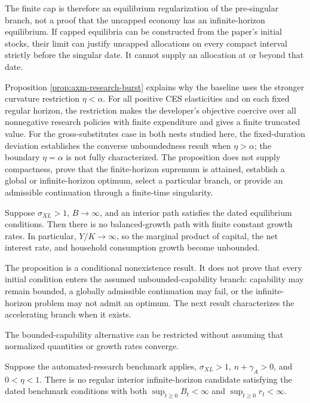 The finite cap is therefore an equilibrium regularization of the pre-singular
branch, not a proof that the uncapped economy has an infinite-horizon
equilibrium. If capped equilibria can be constructed from the paper's initial
stocks, their limit can justify uncapped allocations on every compact interval
strictly before the singular date. It cannot supply an allocation at or beyond
that date.

Proposition \ref{prop:axm-research-burst} explains why the baseline uses the
stronger curvature restriction \(\eta<\alpha\). For all positive CES
elasticities and on each fixed regular horizon, the restriction makes the
developer's objective coercive over all nonnegative research policies with
finite expenditure and gives a finite truncated value. For the gross-substitutes
case in both nests studied here, the fixed-duration deviation establishes the
converse unboundedness result when \(\eta>\alpha\); the boundary
\(\eta=\alpha\) is not fully characterized.
The proposition does not supply compactness, prove that the finite-horizon
supremum is attained, establish a global or infinite-horizon optimum, select a
particular branch, or provide an admissible continuation through a finite-time
singularity.

\begin{proposition}
\label{prop:axm-no-bgp}
Suppose \(\sigma_{XL}>1\), \(B\to\infty\), and an interior path satisfies the
dated equilibrium conditions. Then there is no balanced-growth path with finite
constant growth rates. In particular, \(Y/K\to\infty\), so the marginal product
of capital, the net interest rate, and household consumption growth become
unbounded.
\end{proposition}

The proposition is a conditional nonexistence result. It does not prove that every
initial condition enters the assumed unbounded-capability branch: capability may
remain bounded, a globally admissible continuation may fail, or the
infinite-horizon problem may not admit an optimum. The next result characterizes
the accelerating branch when it exists.

The bounded-capability alternative can be restricted without assuming that
normalized quantities or growth rates converge.

\begin{proposition}
\label{prop:axm-no-bounded-capability-tail}
Suppose the automated-research benchmark applies,
\(\sigma_{XL}>1\), \(n+\gamma_A>0\), and \(0<\eta<1\). There is no regular
interior infinite-horizon candidate satisfying the dated benchmark conditions
with both \(\sup_{t\geq0}B_t<\infty\) and
\(\sup_{t\geq0}r_t<\infty\).
\end{proposition}

